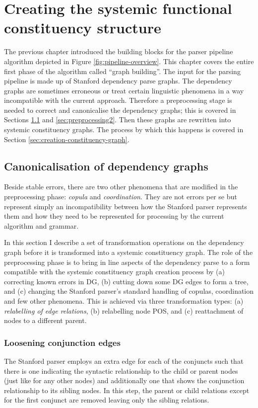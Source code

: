 \chapter{Creating the systemic functional constituency structure}
\label{ch:parsing-algorithm}

    The previous chapter introduced the building blocks for the parser pipeline algorithm depicted in Figure \ref{fig:pipeline-overview}. This chapter covers the entire first phase of the algorithm called ``graph building''. The input for the parsing pipeline is made up of Stanford dependency parse graphs. The dependency graphs are sometimes erroneous or treat certain linguistic phenomena in a way incompatible with the current approach. Therefore a preprocessing stage is needed to correct and canonicalise the dependency graphs; this is covered in Sections \ref{sec:preprocessing1} and \ref{sec:preprocessing2}. Then these graphs are rewritten into systemic constituency graphs. The process by which this happens is covered in Section \ref{sec:creation-constituency-graph}.

\section{Canonicalisation of dependency graphs}
\label{sec:preprocessing1}
    Beside stable errors, there are two other phenomena that are modified in the preprocessing phase: \textit{copula} and \textit{coordination}. They are not errors per se but represent simply an incompatibility between how the Stanford parser represents them and how they need to be represented for processing by the current algorithm and grammar.

    In this section I describe a set of transformation operations on the dependency graph before it is transformed into a systemic constituency graph. The role of the preprocessing phase is to bring in line aspects of the dependency parse to a form compatible with the systemic constituency graph creation process by (a) correcting known errors in DG, (b) cutting down some DG edges to form a tree, and (c) changing the Stanford parser's standard handling of copulas, coordination and few other phenomena. This is achieved via three transformation types: (a) \textit{relabelling of edge relations}, (b) relabelling node POS, and (c) reattachment of nodes to a different parent. 

\subsection{Loosening conjunction edges}
    The Stanford parser employs an extra edge for each of the conjuncts such that there is one indicating the syntactic relationship to the child or parent nodes (just like for any other nodes) and additionally one that shows the conjunction relationship to its sibling nodes. In this step, the parent or child relations except for the first conjunct are removed leaving only the sibling relations. 

